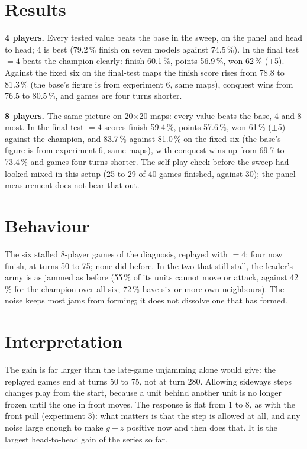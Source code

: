 \documentclass{../polyexp}
\begin{document}
\section{Results}
\ExpResults

\textbf{4 players.} Every tested value beats the base in the sweep, on the panel and head to head; 4 is best (79.2\,\% finish on seven models against 74.5\,\%). In the final test  $=4$ beats the champion clearly: finish 60.1\,\%, points 56.9\,\%, won 62\,\% ($\pm$5). Against the fixed six on the final-test maps the finish score rises from 78.8 to 81.3\,\% (the base's figure is from experiment 6, same maps), conquest wins from 76.5 to 80.5\,\%, and games are four turns shorter.

\textbf{8 players.} The same picture on 20$\times$20 maps: every value beats the base, 4 and 8 most. In the final test  $=4$ scores finish 59.4\,\%, points 57.6\,\%, won 61\,\% ($\pm$5) against the champion, and 83.7\,\% against 81.0\,\% on the fixed six (the base's figure is from experiment 6, same maps), with conquest wins up from 69.7 to 73.4\,\% and games four turns shorter. The self-play check before the sweep had looked mixed in this setup (25 to 29 of 40 games finished, against 30); the panel measurement does not bear that out.

\section{Behaviour}
The six stalled 8-player games of the diagnosis, replayed with  $=4$: four now finish, at turns 50 to 75; none did before. In the two that still stall, the leader's army is as jammed as before (55\,\% of its units cannot move or attack, against 42\,\% for the champion over all six; 72\,\% have six or more own neighbours). The noise keeps most jams from forming; it does not dissolve one that has formed.


\section{Interpretation}
The gain is far larger than the late-game unjamming alone would give: the replayed games end at turns 50 to 75, not at turn 280. Allowing sideways steps changes play from the start, because a unit behind another unit is no longer frozen until the one in front moves. The response is flat from 1 to 8, as with the front pull (experiment 3): what matters is that the step is allowed at all, and any noise large enough to make $g+z$ positive now and then does that. It is the largest head-to-head gain of the series so far.
\end{document}
